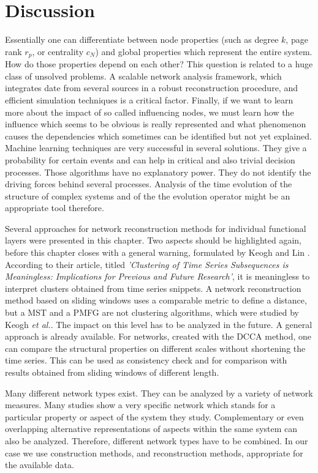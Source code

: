 \documentclass[a4paper,10pt]{scrbook}
\begin{document}
\section{Discussion}

Essentially one can differentiate between node properties (such as degree $k$, page rank $r_p$, or centrality $c_N$) and global properties which represent the entire system. How do those properties depend on each other? This question is related to a huge class of unsolved problems. A scalable network analysis framework, which integrates date from several sources in a robust reconstruction procedure, and efficient simulation techniques is a critical factor. Finally, if we want to learn more about the impact of so called influencing nodes, we must learn how the influence which seems to be obvious is really represented and what phenomenon causes the dependencies which sometimes can be identified but not yet explained. Machine learning techniques are very successful in several solutions. They give a probability for certain events and can help in critical and also trivial decision processes. Those algorithms have no explanatory power. They do not identify the driving forces behind several processes. Analysis of the time evolution of the structure of complex systems and of the the evolution operator might be an appropriate tool therefore. 

Several approaches for network reconstruction methods for individual functional layers were presented in this chapter. Two aspects should be highlighted again, before this chapter closes with a general warning, formulated by Keogh and Lin \cite{Keogh2005}. According to their article, titled \textit{'Clustering of Time Series Subsequences is Meaningless: Implications for Previous and Future Research'}, it is meaningless to interpret clusters obtained from time series snippets. A network reconstruction method based on sliding windows uses a comparable metric to define a distance, but a MST and a PMFG are not clustering algorithms, which were studied by Keogh \textit{et al.}. The impact on this level has to be analyzed in the future. A general approach is already available. For networks, created with the DCCA method, one can compare the structural properties on different scales without shortening the time series. This can be used as  consistency check and for comparison with results obtained from sliding windows of different length.

Many different network types exist. They can be analyzed by a variety of network measures. Many studies show a very specific network which stands for a particular property or aspect of the system they study. Complementary or even overlapping alternative representations of aspects within the same system can also be analyzed. Therefore, different network types have to be combined. In our case we use construction methods, and reconstruction methods, appropriate for the available data.
\end{document}
